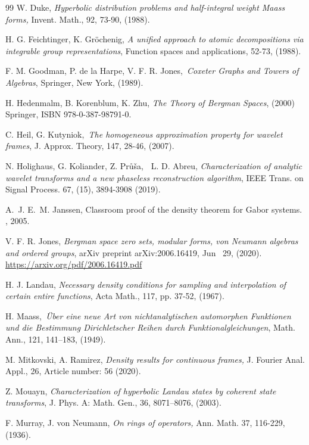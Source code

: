 \documentclass[11pt,reqno]{amsart}
\numberwithin{equation}{section}
\theoremstyle{plain}
\theoremstyle{definition}
\theoremstyle{remark}
\begin{document}
\begin{thebibliography}{99}
 W. Duke, \emph{Hyperbolic distribution problems and
half-integral weight Maass forms,} Invent. Math., 92, 73-90, (1988).

 H. G. Feichtinger, K. Gr\"{o}chenig, \emph{A unified approach
to atomic decompositions via integrable group representations}, Function
spaces and applications, 52-73, (1988).

 F. M. Goodman, P. de la Harpe, V. F. R. Jones,\emph{\
Coxeter Graphs and Towers of Algebras}, Springer, New York, (1989).

 H. Hedenmalm, B. Korenblum, K. Zhu, \emph{The Theory of
Bergman Spaces}, (2000) Springer, ISBN 978-0-387-98791-0.

 C. Heil, G. Kutyniok,\emph{\ The homogeneous approximation
property for wavelet frames}, J. Approx. Theory, 147, 28-46, (2007).

 N. Holighaus, G. Koliander, Z. Pr\r{u}\v{s}a,%
\textbf{\ }L. D. Abreu, \emph{Characterization of analytic wavelet
transforms and a new phaseless reconstruction algorithm}, IEEE Trans. on
Signal Process. 67, (15), 3894-3908 (2019).

 A.~J. E.~M. Janssen, \newblock Classroom proof of the
density theorem for {G}abor systems. 
, 2005.

 V. F. R. Jones, \emph{Bergman space zero sets, modular
forms, von Neumann algebras and ordered groups}, arXiv preprint
arXiv:2006.16419, Jun \ 29, (2020). %
\url{https://arxiv.org/pdf/2006.16419.pdf}

 H. J. Landau, \emph{Necessary density conditions for
sampling and interpolation of certain entire functions}, Acta Math., 117,
pp. 37-52, (1967).

 H. Maass,\emph{\ \"{U}ber eine neue Art von
nichtanalytischen automorphen Funktionen und die Bestimmung Dirichletscher
Reihen durch Funktionalgleichungen}, Math. Ann., 121, 141--183, (1949).

 M. Mitkovski, A. Ramirez, \emph{Density results for
continuous frames,} J. Fourier Anal. Appl., 26, Article number: 56 (2020).

 Z. Mouayn, \emph{Characterization of hyperbolic Landau
states by coherent state transforms}, J. Phys. A: Math. Gen., 36,
8071--8076, (2003).

 F. Murray, J. von Neumann, \emph{On rings of
operators,} Ann. Math. 37, 116-229, (1936).


\end{thebibliography}
\end{document}
